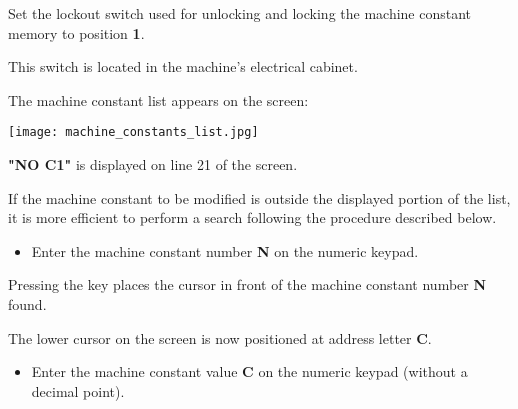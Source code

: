 \vspace{.5cm}

Set the lockout switch used for unlocking and locking the machine constant memory to position \textbf{1}.


This switch is located in the machine's electrical cabinet.

The machine constant list appears on the screen:

\begin{center}
    \texttt{[image: machine\_constants\_list.jpg]}
\end{center}

\textbf{"NO C1"} is displayed on line 21 of the screen.

\begin{itemize}
\end{itemize}

\newpage

If the machine constant to be modified is outside the displayed portion of the list, it is more efficient to perform a search following the procedure described below.

\begin{itemize}
    \item Enter the machine constant number \textbf{N} on the numeric keypad.
\end{itemize}

\vspace{.5cm}

\begin{itemize}
\end{itemize}

Pressing the key places the cursor in front of the machine constant number \textbf{N} found.

The lower cursor on the screen is now positioned at address letter \textbf{C}.

\begin{itemize}
    \item Enter the machine constant value \textbf{C} on the numeric keypad (without a decimal point).
\end{itemize}

